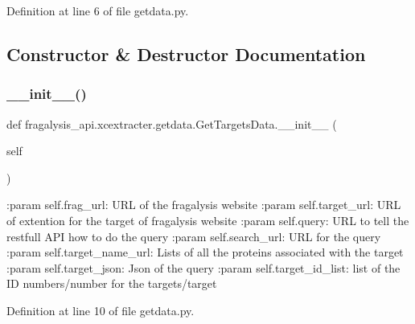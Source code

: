 Definition at line 6 of file getdata.\+py.



\subsection{Constructor \& Destructor Documentation}
\mbox{\label{classfragalysis__api_1_1xcextracter_1_1getdata_1_1_get_targets_data_a40260f1d84f75c354f8b1b7124732b3a}} 
\subsubsection{\texorpdfstring{\+\_\+\+\_\+init\+\_\+\+\_\+()}{\_\_init\_\_()}}
{\footnotesize\ttfamily def fragalysis\+\_\+api.\+xcextracter.\+getdata.\+Get\+Targets\+Data.\+\_\+\+\_\+init\+\_\+\+\_\+ (\begin{DoxyParamCaption}\item[{}]{self }\end{DoxyParamCaption})}

\begin{DoxyVerb}:param self.frag_url: URL of the fragalysis website
:param self.target_url: URL of extention for the target of fragalysis website
:param self.query: URL to tell the restfull API how to do the query
:param self.search_url: URL for the query 
:param self.target_name_url: Lists of all the proteins associated with the target
:param self.target_json: Json of the query
:param self.target_id_list: list of the ID numbers/number for the targets/target
\end{DoxyVerb}
 

Definition at line 10 of file getdata.\+py.


